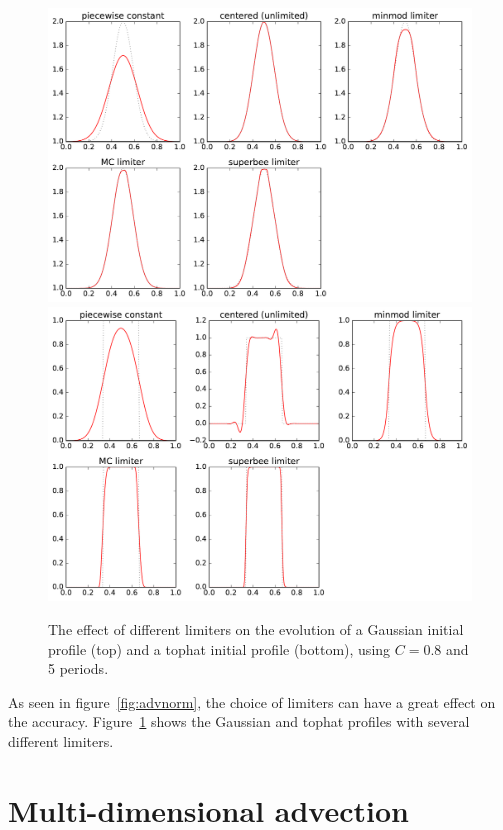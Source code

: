 \begin{figure}[ht]
\centering
\includegraphics[width=0.8\linewidth]{fv-gaussian-limiters} \\[1em]
\includegraphics[width=0.8\linewidth]{fv-tophat-limiters} 
\caption[Effect of different limiters on evolution]
        {\label{fig:limiter_panel} The effect of different limiters on the
          evolution of a Gaussian initial profile (top) and a tophat initial
          profile (bottom), using $C = 0.8$ and 5 periods. \\
        }
\end{figure}

As seen in figure~\ref{fig:advnorm}, the choice of limiters can have a great
effect on the accuracy.  Figure~\ref{fig:limiter_panel} shows the Gaussian and
tophat profiles with several different limiters.

\section{Multi-dimensional advection}

